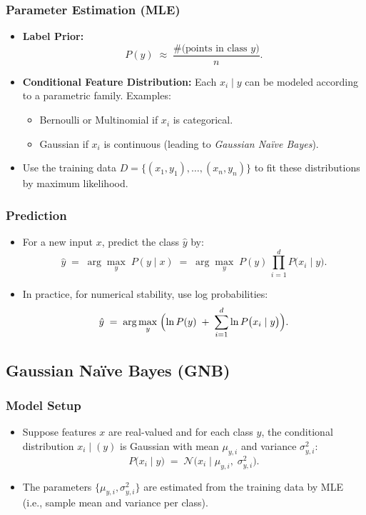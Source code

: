 \documentclass[twocolumn]{article}
\begin{document}
\begin{spacing}{1}
\subsubsection{Parameter Estimation (MLE)}
\begin{itemize}
    \item \textbf{Label Prior:} 
    \[
        P(y) \;\approx\; \frac{\text{\#(points in class }y\text{)}}{n}.
    \]
    \item \textbf{Conditional Feature Distribution:} Each $x_i \mid y$ can be modeled according to a parametric family. Examples:
    \begin{itemize}
        \item Bernoulli or Multinomial if $x_i$ is categorical.
        \item Gaussian if $x_i$ is continuous (leading to \emph{Gaussian Na\"ive Bayes}).
    \end{itemize}
    \item Use the training data $D = \{(x_1, y_1), \dots, (x_n, y_n)\}$ to fit these distributions by maximum likelihood.
\end{itemize}

\subsubsection{Prediction}
\begin{itemize}
    \item For a new input $x$, predict the class $\hat{y}$ by:
    \[
        \hat{y}
        \;=\;
        \arg\max_{y}\;
        P(y \mid x)
        \;=\;
        \arg\max_{y}\;
        P(y)\,\prod_{i=1}^d P\bigl(x_i \mid y\bigr).
    \]
    \item In practice, for numerical stability, use log probabilities:
    \[
        \hat{y}
        \;=\;
        \arg\max_{y}\;
        \Bigl(
            \ln P(y)
            \;+\;
            \sum_{i=1}^d \ln P\bigl(x_i \mid y\bigr)
        \Bigr).
    \]
\end{itemize}

\subsection{Gaussian Na\"ive Bayes (GNB)}
\subsubsection{Model Setup}
\begin{itemize}
    \item Suppose features $x$ are real-valued and for each class $y$, the conditional distribution $x_i \mid (y)$ is Gaussian with mean $\mu_{y,i}$ and variance $\sigma_{y,i}^2$:
    \[
        P\bigl(x_i \mid y\bigr)
        \;=\;
        \mathcal{N}\!\bigl(x_i \;\big|\; \mu_{y,i}, \;\sigma_{y,i}^2\bigr).
    \]
    \item The parameters $\{\mu_{y,i}, \sigma_{y,i}^2\}$ are estimated from the training data by MLE (i.e., sample mean and variance per class).
\end{itemize}


\end{spacing}
\end{document}
